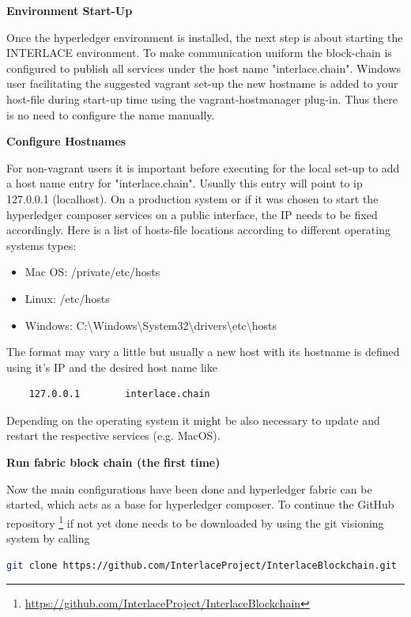 \textbf{Environment Start-Up}

Once the hyperledger environment is installed, the next step is about starting the INTERLACE environment. To make communication uniform the block-chain is configured to publish all services under the host name "interlace.chain". Windows user facilitating the suggested vagrant set-up the new hostname is added to your host-file during start-up time using the vagrant-hostmanager plug-in. Thus there is no need to configure the name manually.

\textbf{Configure Hostnames}

For non-vagrant users it is important before executing for the local set-up to add a host name entry for "interlace.chain". Usually this entry will point to ip 127.0.0.1 (localhost). On a production system or if it was chosen to start the hyperledger composer services on a public interface, the IP needs to be fixed accordingly. Here is a list of hosts-file locations according to different operating systems types:

\begin{itemize}
	\item Mac OS: /private/etc/hosts
    \item Linux: /etc/hosts
    \item Windows: C:\textbackslash Windows\textbackslash System32\textbackslash drivers\textbackslash etc\textbackslash hosts
\end{itemize}

The format may vary a little but usually a new host with its hostname is defined using it's IP and the desired host name like

\begin{lstlisting}
	127.0.0.1        interlace.chain
\end{lstlisting}

Depending on the operating system it might be also necessary to update and restart the respective services (e.g. MacOS).

\textbf{Run fabric block chain (the first time)}

Now the main configurations have been done and hyperledger fabric can be started, which acts as a base for hyperledger composer. To continue the GitHub repository \footnote{\url{https://github.com/InterlaceProject/InterlaceBlockchain}} if not yet done needs to be downloaded by using the git visioning system by calling

\begin{lstlisting}[language=bash]
	git clone https://github.com/InterlaceProject/InterlaceBlockchain.git
\end{lstlisting}


